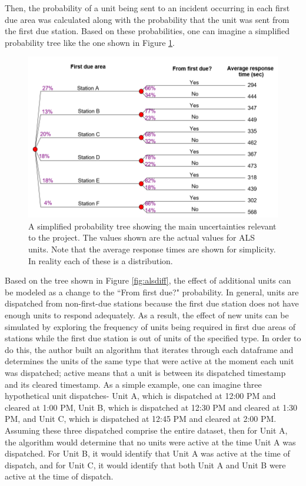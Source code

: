 \documentclass[article]{proc}
\begin{document}
Then, the probability of a unit being sent to an incident occurring in each first due area was calculated along with the probability that the unit was sent from the first due station. Based on these probabilities, one can imagine a simplified probability tree like the one shown in Figure \ref{fig:alstree}. 

\begin{figure}[!htb]
  \centering
  \includegraphics[width=16cm,keepaspectratio]{Figures/alstree.PNG}
  \caption{A simplified probability tree showing the main uncertainties relevant to the project. The values shown are the actual values for ALS units. Note that the average response times are shown for simplicity. In reality each of these is a distribution.}
  \label{fig:alstree}
\end{figure}

Based on the tree shown in Figure \ref{fig:alsdiff}, the effect of additional units can be modeled as a change to the ``From first due?" probability. In general, units are dispatched from non-first-due stations because the first due station does not have enough units to respond adequately. As a result, the effect of new units can be simulated by exploring the frequency of units being required in first due areas of stations while the first due station is out of units of the specified type. In order to do this, the author built an algorithm that iterates through each dataframe and determines the units of the same type that were active at the moment each unit was dispatched; active means that a unit is between its dispatched timestamp and its cleared timestamp.
As a simple example, one can imagine three hypothetical unit dispatches- Unit A, which is dispatched at 12:00 PM and cleared at 1:00 PM, Unit B, which is dispatched at 12:30 PM and cleared at 1:30 PM, and Unit C, which is dispatched at 12:45 PM and cleared at 2:00 PM. Assuming these three dispatched comprise the entire dataset, then for Unit A, the algorithm would determine that no units were active at the time Unit A was dispatched. For Unit B, it would identify that Unit A was active at the time of dispatch, and for Unit C, it would identify that both Unit A and Unit B were active at the time of dispatch. 
\end{document}
